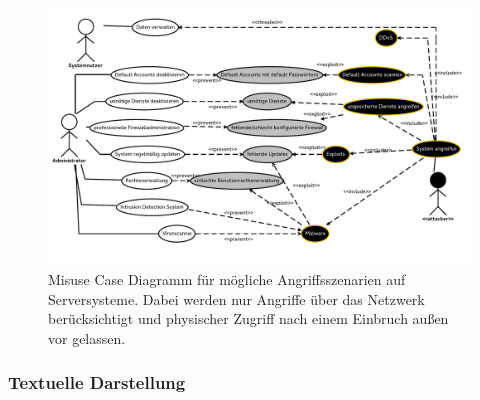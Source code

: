 \begin{figure}[h]
\includegraphics[scale=0.8,angle=90]{images/Server.pdf} 
\caption{Misuse Case Diagramm für mögliche Angriffsszenarien auf Serversysteme. Dabei werden nur Angriffe über das Netzwerk berücksichtigt und physischer Zugriff nach einem Einbruch außen vor gelassen.}
\end{figure}

\clearpage
\subsubsection{Textuelle Darstellung}

